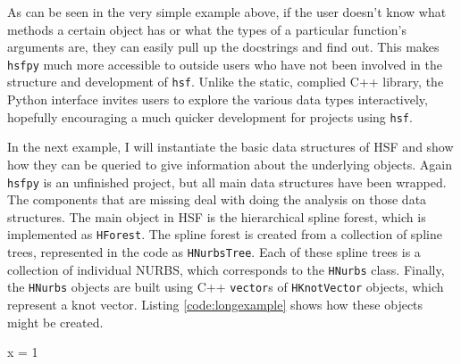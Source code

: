   \vspace{.2in}
  
  \mainstretch{}

  As can be seen in the very simple example above, if the user doesn't know what methods a certain object has or what the types of a particular function's arguments are, they can easily pull up the docstrings and find out. This makes \texttt{hsfpy} much more accessible to outside users who have not been involved in the structure and development of \texttt{hsf}. Unlike  the static, complied C++ library, the Python interface invites users to explore the various data types interactively, hopefully encouraging a much quicker development for projects using \texttt{hsf}.

  In the next example, I will instantiate the basic data structures of HSF and show how they can be queried to give information about the underlying objects. Again \texttt{hsfpy} is an unfinished project, but all main data structures have been wrapped. The components that are missing deal with doing the analysis on those data structures. The main object in HSF is the hierarchical spline forest, which is implemented as \texttt{HForest}. The spline forest is created from a collection of spline trees, represented in the code as \texttt{HNurbsTree}. Each of these spline trees is a collection of individual NURBS, which corresponds to the \texttt{HNurbs} class. Finally, the \texttt{HNurbs} objects are built using C++ \texttt{vector}s of \texttt{HKnotVector} objects, which represent a knot vector. Listing \ref{code:longexample} shows how these objects might be created.

  \begin{code}
    x = 1
  \end{code}


